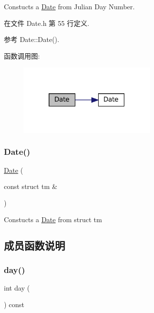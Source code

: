 Constucts a \hyperlink{classmuduo_1_1Date}{Date} from Julian Day Number. 

在文件 Date.\+h 第 55 行定义.



参考 Date\+::\+Date().

函数调用图\+:
\nopagebreak
\begin{figure}[H]
\begin{center}
\leavevmode
\includegraphics[width=196pt]{classmuduo_1_1Date_aeadd49d9f6ac56d1cf22bd65367f4fd0_cgraph}
\end{center}
\end{figure}
\mbox{\label{classmuduo_1_1Date_ae8448dcfa75348c590441b5994472e4f}} 
\subsubsection{\texorpdfstring{Date()}{Date()}\hspace{0.1cm}{\footnotesize\ttfamily [4/4]}}
{\footnotesize\ttfamily \hyperlink{classmuduo_1_1Date}{Date} (\begin{DoxyParamCaption}\item[{const struct tm \&}]{ }\end{DoxyParamCaption})\hspace{0.3cm}{\ttfamily [explicit]}}

Constucts a \hyperlink{classmuduo_1_1Date}{Date} from struct tm 

\subsection{成员函数说明}
\mbox{\label{classmuduo_1_1Date_a912344e9b0a67db916e2bac3c43337dc}} 
\subsubsection{\texorpdfstring{day()}{day()}}
{\footnotesize\ttfamily int day (\begin{DoxyParamCaption}{ }\end{DoxyParamCaption}) const\hspace{0.3cm}{\ttfamily [inline]}}



